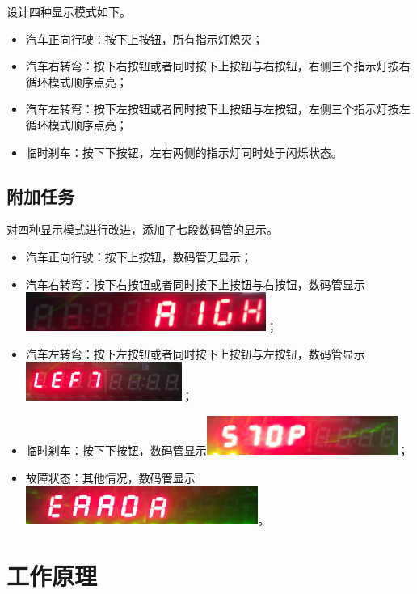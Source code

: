 \documentclass[11pt, a4paper]{article}
\begin{document}
\begin{CJK*}{UTF8}{gbsn}
  设计四种显示模式如下。

  \begin{itemize}
  \item 汽车正向行驶：按下上按钮，所有指示灯熄灭；
  \item 汽车右转弯：按下右按钮或者同时按下上按钮与右按钮，右侧三个指示灯按右循环模式顺序点亮；
  \item 汽车左转弯：按下左按钮或者同时按下上按钮与左按钮，左侧三个指示灯按左循环模式顺序点亮；
  \item 临时刹车：按下下按钮，左右两侧的指示灯同时处于闪烁状态。
  \end{itemize}

  \subsection{附加任务}

  对四种显示模式进行改进，添加了七段数码管的显示。

  \begin{itemize}
  \item 汽车正向行驶：按下上按钮，数码管无显示；
  \item 汽车右转弯：按下右按钮或者同时按下上按钮与右按钮，数码管显示\includegraphics[height=0.5in]{right.jpg}；
  \item 汽车左转弯：按下左按钮或者同时按下上按钮与左按钮，数码管显示\includegraphics[height=0.5in]{left.jpg}；
  \item 临时刹车：按下下按钮，数码管显示\includegraphics[height=0.5in]{stop.jpg}；
  \item 故障状态：其他情况，数码管显示\includegraphics[height=0.5in]{error.jpg}。
  \end{itemize}

  \section{工作原理}


\end{CJK*}
\end{document}
